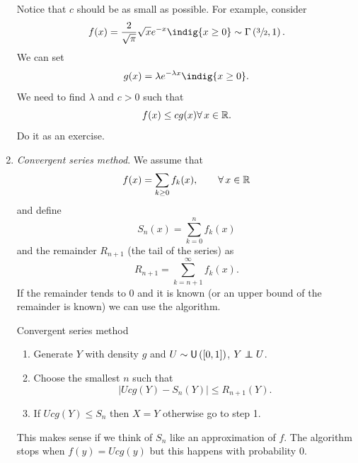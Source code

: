 \documentclass[12pt]{report}
\begin{document}
\begin{enumerate}[\circnum]
	Notice that $c$ should be as small as possible. For example, consider 
	\begin{equation*}
		f(x)=\frac{2}{\sqrt{\pi}}\sqrt{x}e^{-x}\indig{x\geq0}\sim\Gamma\left(\sfrac{3}{2},1\right).
	\end{equation*}
	We can set 
	\begin{equation*}
		g(x)=\lambda e^{-\lambda x}\indig{x\geq0}. 
	\end{equation*}
	We need to find $\lambda$ and $c>0$ such that 
	\begin{equation*}
		f(x)\leq cg(x) \forall\, x\in\mathbb{R}.
	\end{equation*}
	Do it as an exercise.
	\item \emph{Convergent series method}. We assume that 
	\begin{equation*}
		f(x)=\sum_{k\geq0}f_{k}(x),\qquad\forall\, x\in\mathbb{R}
	\end{equation*}
	and define
	\begin{equation*}
		S_{n}(x)=\sum_{k=0}^{n}f_{k}(x)
	\end{equation*}
	and the remainder $R_{n+1}$ (the tail of the series) as
	\begin{equation*}
		R_{n+1}=\sum_{k=n+1}^{\infty}f_{k}(x).
	\end{equation*}
	If the remainder tends to 0 and it is known (or an upper bound of the remainder is known) we can use the algorithm.
	\begin{algobox}{Convergent series method}
		\begin{enumerate}
			\item Generate $Y$ with density $g$ and $U\sim\mathsf{U}\left([0,1]\right)$, $Y\independent U$.
			\item Choose the smallest $n$ such that
			\begin{equation*}
				\left|Ucg(Y)-S_{n}(Y)\right|\leq R_{n+1}(Y).
			\end{equation*}
			\item If $Ucg(Y)\leq S_{n}$ then $X=Y$ otherwise go to step 1.
		\end{enumerate}
	\end{algobox}
	This makes sense if we think of $S_{n}$ like an approximation of $f$. The algorithm stops when $f(y)=Ucg(y)$ but this happens with probability 0.
\end{enumerate}
\end{document}
